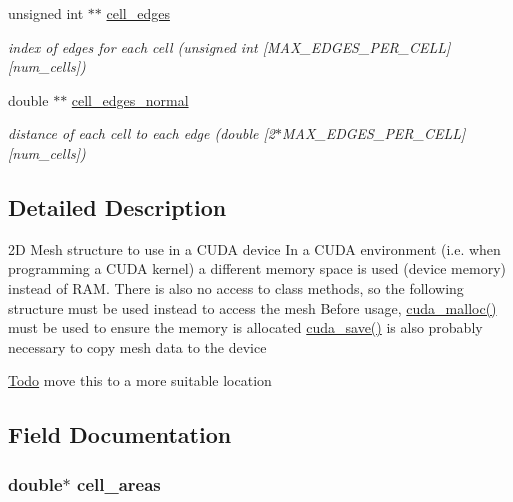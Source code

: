 \begin{DoxyCompactItemize}
unsigned int $\ast$$\ast$ \hyperlink{structFVL_1_1CFVMesh2D_1_1CFVMesh2D__cuda_a618dbcd16053ddd3695a69d156f9caea}{cell\_\-edges}
\begin{DoxyCompactList}\small\item\em index of edges for each cell (unsigned int \mbox{[}MAX\_\-EDGES\_\-PER\_\-CELL\mbox{]}\mbox{[}num\_\-cells\mbox{]}) \item\end{DoxyCompactList}\item 
double $\ast$$\ast$ \hyperlink{structFVL_1_1CFVMesh2D_1_1CFVMesh2D__cuda_a8f355297b336ee7533f50e27b552216e}{cell\_\-edges\_\-normal}
\begin{DoxyCompactList}\small\item\em distance of each cell to each edge (double \mbox{[}2$\ast$MAX\_\-EDGES\_\-PER\_\-CELL\mbox{]}\mbox{[}num\_\-cells\mbox{]}) \item\end{DoxyCompactList}\end{DoxyCompactItemize}


\subsection{Detailed Description}
2D Mesh structure to use in a CUDA device In a CUDA environment (i.e. when programming a CUDA kernel) a different memory space is used (device memory) instead of RAM. There is also no access to class methods, so the following structure must be used instead to access the mesh Before usage, \hyperlink{classFVL_1_1CFVMesh2D_aa84c3c881bec148d68a3e847feb4ecd5}{cuda\_\-malloc()} must be used to ensure the memory is allocated \hyperlink{classFVL_1_1CFVMesh2D_a817cca487c7f644b7e5d1abf8bd42308}{cuda\_\-save()} is also probably necessary to copy mesh data to the device

\begin{Desc}
\item[\hyperlink{todo__todo000003}{Todo}]move this to a more suitable location \end{Desc}


\subsection{Field Documentation}
\hypertarget{structFVL_1_1CFVMesh2D_1_1CFVMesh2D__cuda_ae8676892fd56ea5c4828b46ed48c222d}{
\subsubsection[{cell\_\-areas}]{\setlength{\rightskip}{0pt plus 5cm}double$\ast$ {\bf cell\_\-areas}}}
\label{d6/d30/structFVL_1_1CFVMesh2D_1_1CFVMesh2D__cuda_ae8676892fd56ea5c4828b46ed48c222d}


